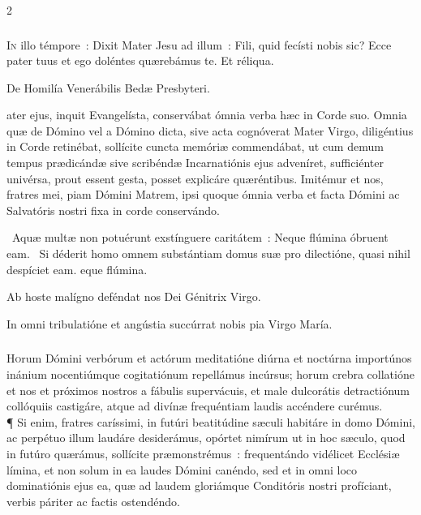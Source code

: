 \documentclass[9pt,twoside]{extarticle}
\begin{document}
\begin{multicols}{2}
{\subsubsection*{\center {}}
\lettrine{I}n illo témpore~: Dixit Mater Jesu ad illum~: Fili, quid fecísti nobis sic? Ecce pater tuus et ego doléntes quærebámus te. Et réliqua.

\begin{center}De Homilía Venerábilis Bedæ Presbyteri.\\
\end{center}
ater ejus, inquit Evangelísta, conservábat ómnia verba hæc in Corde suo. Omnia quæ de Dómino vel a Dómino dicta, sive acta cognóverat Mater Virgo, diligéntius in Corde retinébat, sollícite cuncta memóriæ commendábat, ut cum demum tempus prædicándæ sive scribéndæ Incarnatiónis ejus adveníret, sufficiénter univérsa, prout essent gesta, posset explicáre quæréntibus. Imitémur et nos, fratres mei, piam Dómini Matrem, ipsi quoque ómnia verba et facta Dómini ac Salvatóris nostri fixa in corde conservándo.

\begin{tightlist}{}
\item {}~Aquæ multæ non potuérunt exstínguere caritátem~: \textred{*} Neque flúmina óbruent eam. ~Si déderit homo omnem substántiam domus suæ pro dilectióne, quasi nihil despíciet eam. eque flúmina.
\item {} Ab hoste malígno deféndat nos Dei Génitrix Virgo.
\item {} In omni tribulatióne et angústia succúrrat nobis pia Virgo María.
\end{tightlist}

\subsubsection*{\center {}}
\lettrine{H}orum Dómini verbórum et actórum meditatióne diúrna et noctúrna importúnos inánium nocentiúmque cogitatiónum repellámus incúrsus; horum crebra collatióne et nos et próximos nostros a fábulis supervácuis, et male dulcorátis detractiónum collóquiis castigáre, atque ad divínæ frequéntiam laudis accéndere curémus.\\
¶ Si enim, fratres caríssimi, in futúri beatitúdine sæculi habitáre in domo Dómini, ac perpétuo illum laudáre desiderámus, opórtet nimírum ut in hoc sæculo, quod in futúro quærámus, sollícite præmonstrémus~: frequentándo vidélicet Ecclésiæ límina, et non solum in ea laudes Dómini canéndo, sed et in omni loco dominatiónis ejus ea, quæ ad laudem gloriámque Conditóris nostri profíciant, verbis páriter ac factis ostendéndo.

}
\end{multicols}
\end{document}
